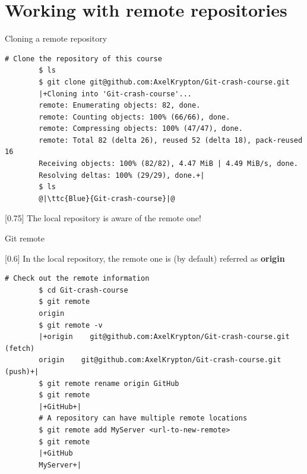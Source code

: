 \documentclass[usenames,svgnames,14pt]{beamer}
\newcommand{\ttc}[2]{\texttt{\textcolor{#1}{#2}}}%
\begin{document}
\begin{frame}[plain]{}
    \centering
    \vfill
    \vfill
\end{frame}

\section{Working with remote repositories}
\begin{frame}[fragile]{Cloning a remote repository}
    \begin{lstlisting}[style=MyBash, xleftmargin=-1mm, xrightmargin=-1mm]
        # Clone the repository of this course
        $ ls
        $ git clone git@github.com:AxelKrypton/Git-crash-course.git
        |+Cloning into 'Git-crash-course'...
        remote: Enumerating objects: 82, done.
        remote: Counting objects: 100% (66/66), done.
        remote: Compressing objects: 100% (47/47), done.
        remote: Total 82 (delta 26), reused 52 (delta 18), pack-reused 16
        Receiving objects: 100% (82/82), 4.47 MiB | 4.49 MiB/s, done.
        Resolving deltas: 100% (29/29), done.+|
        $ ls
        @|\ttc{Blue}{Git-crash-course}|@
    \end{lstlisting}
    \begin{varblock}{}[0.75\textwidth]{}
        The local repository is aware of the remote one!
    \end{varblock}
\end{frame}
\begin{frame}[fragile]{Git remote}
    \vspace{-3mm}
    \begin{varblock}{}[0.6\textwidth]{}
        In the local repository, the remote one is (by default) referred as \textbf{origin}
    \end{varblock}
    \begin{lstlisting}[style=MyBash, xleftmargin=-1mm, xrightmargin=-1mm]
        # Check out the remote information
        $ cd Git-crash-course
        $ git remote
        origin
        $ git remote -v
        |+origin    git@github.com:AxelKrypton/Git-crash-course.git (fetch)
        origin    git@github.com:AxelKrypton/Git-crash-course.git (push)+|
        $ git remote rename origin GitHub
        $ git remote
        |+GitHub+|
        # A repository can have multiple remote locations
        $ git remote add MyServer <url-to-new-remote>
        $ git remote
        |+GitHub
        MyServer+|
    \end{lstlisting}
\end{frame}
\end{document}
